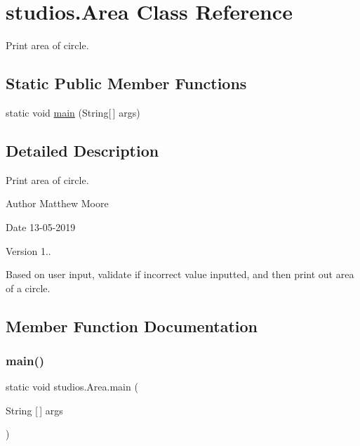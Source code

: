 \hypertarget{classstudios_1_1_area}{}\section{studios.\+Area Class Reference}
\label{classstudios_1_1_area}


Print area of circle.  


\subsection*{Static Public Member Functions}
\begin{DoxyCompactItemize}
\item 
static void \mbox{\hyperlink{classstudios_1_1_area_ace8a7bdd217d746782d18bf6cf7c6791}{main}} (String\mbox{[}$\,$\mbox{]} args)
\end{DoxyCompactItemize}


\subsection{Detailed Description}
Print area of circle. 

\begin{DoxyAuthor}{Author}
Matthew Moore 
\end{DoxyAuthor}
\begin{DoxyDate}{Date}
13-\/05-\/2019 
\end{DoxyDate}
\begin{DoxyVersion}{Version}
1..
\end{DoxyVersion}
Based on user input, validate if incorrect value inputted, and then print out area of a circle. 

\subsection{Member Function Documentation}
\mbox{\label{classstudios_1_1_area_ace8a7bdd217d746782d18bf6cf7c6791}} 
\subsubsection{\texorpdfstring{main()}{main()}}
{\footnotesize\ttfamily static void studios.\+Area.\+main (\begin{DoxyParamCaption}\item[{String \mbox{[}$\,$\mbox{]}}]{args }\end{DoxyParamCaption})\hspace{0.3cm}{\ttfamily [static]}}

